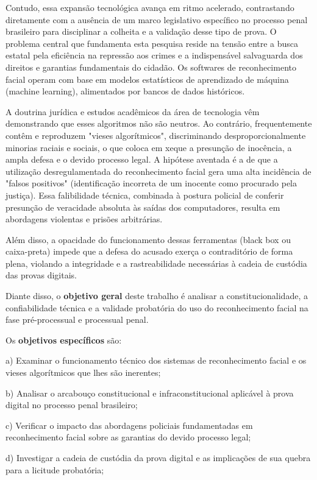 \documentclass[12pt,a4paper]{article}
\begin{document}
Contudo, essa expansão tecnológica avança em ritmo acelerado, contrastando diretamente com a ausência de um marco legislativo específico no processo penal brasileiro para disciplinar a colheita e a validação desse tipo de prova. O problema central que fundamenta esta pesquisa reside na tensão entre a busca estatal pela eficiência na repressão aos crimes e a indispensável salvaguarda dos direitos e garantias fundamentais do cidadão. Os softwares de reconhecimento facial operam com base em modelos estatísticos de aprendizado de máquina (machine learning), alimentados por bancos de dados históricos.

A doutrina jurídica e estudos acadêmicos da área de tecnologia vêm demonstrando que esses algoritmos não são neutros. Ao contrário, frequentemente contêm e reproduzem "vieses algorítmicos", discriminando desproporcionalmente minorias raciais e sociais, o que coloca em xeque a presunção de inocência, a ampla defesa e o devido processo legal. A hipótese aventada é a de que a utilização desregulamentada do reconhecimento facial gera uma alta incidência de "falsos positivos" (identificação incorreta de um inocente como procurado pela justiça). Essa falibilidade técnica, combinada à postura policial de conferir presunção de veracidade absoluta às saídas dos computadores, resulta em abordagens violentas e prisões arbitrárias.

Além disso, a opacidade do funcionamento dessas ferramentas (black box ou caixa-preta) impede que a defesa do acusado exerça o contraditório de forma plena, violando a integridade e a rastreabilidade necessárias à cadeia de custódia das provas digitais.

Diante disso, o \textbf{objetivo geral} deste trabalho é analisar a constitucionalidade, a confiabilidade técnica e a validade probatória do uso do reconhecimento facial na fase pré-processual e processual penal.

Os \textbf{objetivos específicos} são:

a) Examinar o funcionamento técnico dos sistemas de reconhecimento facial e os vieses algorítmicos que lhes são inerentes;

b) Analisar o arcabouço constitucional e infraconstitucional aplicável à prova digital no processo penal brasileiro;

c) Verificar o impacto das abordagens policiais fundamentadas em reconhecimento facial sobre as garantias do devido processo legal;

d) Investigar a cadeia de custódia da prova digital e as implicações de sua quebra para a licitude probatória;
\end{document}
